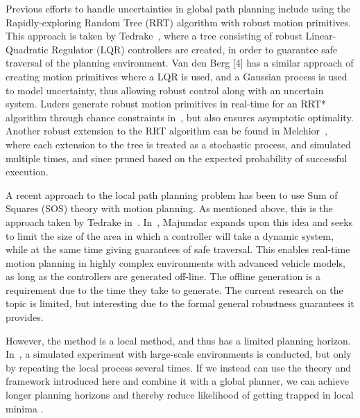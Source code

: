 Previous efforts to handle uncertainties in global path
planning include using the Rapidly-exploring Random Tree
(RRT) algorithm with robust motion primitives. This approach
is taken by Tedrake~\cite{tedrakeLQRtreesFeedbackMotion2009}, where a tree consisting of robust
Linear-Quadratic Regulator (LQR) controllers are created, in
order to guarantee safe traversal of the planning environment.
Van den Berg [4] has a similar approach of creating motion
primitives where a LQR is used, and a Gaussian process
is used to model uncertainty, thus allowing robust control
along with an uncertain system. Luders generate robust motion
primitives in real-time for an RRT* algorithm through chance
constraints in~\cite{luders2013robust}, but also ensures asymptotic optimality.
Another robust extension to the RRT algorithm can be found
in Melchior~\cite{melchior2007particle}, where each extension to the tree is treated
as a stochastic process, and simulated multiple times, and
since pruned based on the expected probability of successful
execution.

A recent approach to the local path planning problem
has been to use Sum of Squares (SOS) theory with motion
planning. As mentioned above, this is the approach taken by
Tedrake in~\cite{tedrakeLQRtreesFeedbackMotion2009}. In~\cite{majumdarFunnelLibrariesRealtime2017}, Majumdar expands upon this idea and
seeks to limit the size of the area in which a controller will take
a dynamic system, while at the same time giving guarantees
of safe traversal. This enables real-time motion planning in
highly complex environments with advanced vehicle models,
as long as the controllers are generated off-line. The offline generation is a requirement due to the time they take
to generate. The current research on the topic is limited, but
interesting due to the formal general robustness guarantees it
provides.

However, the method is a local method, and thus has a
limited planning horizon. In~\cite{majumdarFunnelLibrariesRealtime2017}, a simulated experiment with
large-scale environments is conducted, but only by repeating
the local process several times. If we instead can use the theory
and framework introduced here and combine it with a global
planner, we can achieve longer planning horizons and thereby
reduce likelihood of getting trapped in local minima .

